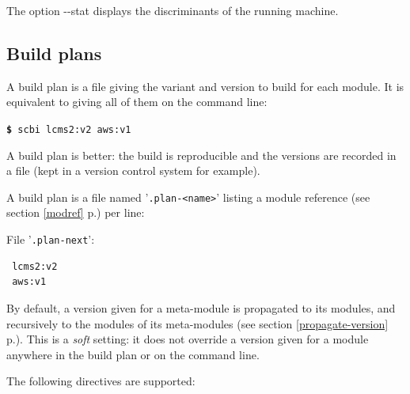 \documentclass[a4paper,12pt,twoside]{article}
\renewcommand{\emph}[1]{\textit{#1}}
\newcommand{\seeref}[1]{see section \ref{#1} p.\pageref{#1}}
\newcommand{\file}[1]{'{\texttt{#1}}'}
\newcommand{\cmd}[1]{\tabto{1cm}\hspace{0.5cm}\texttt{\textbf{\$} #1}}
\newcommand{\ddash}{-{}-}
\begin{document}
The option \ddash{}stat displays the discriminants of the running machine.

\subsection{Build plans}
\label{build-plan}

A build plan is a file giving the variant and version to build for each module. It is equivalent to giving all of them on the command line:

\cmd{scbi lcms2:v2 aws:v1}

A build plan is better: the build is reproducible and the versions are recorded in a file (kept in a version control system for example).

A build plan is a file named \file{.plan-<name>} listing a module reference (\seeref{modref}) per line:

File \file{.plan-next}:
\begin{lstlisting}
 lcms2:v2
 aws:v1
\end{lstlisting}

By default, a version given for a meta-module is propagated to its modules, and recursively to the modules of its meta-modules (\seeref{propagate-version}). This is a \emph{soft} setting: it does not override a version given for a module anywhere in the build plan or on the command line.

The following directives are supported:
\end{document}
